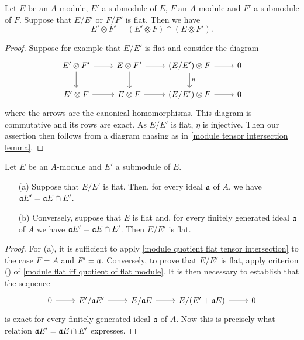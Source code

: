 \begin{proposition}\label{module quotient flat tensor intersection}
Let $E$ be an $A$-module, $E'$ a submodule of $E$, $F$ an $A$-module and $F'$ a submodule of $F$. Suppose that $E/E'$ or $F/F'$ is flat. Then we have
\[E'\otimes F'=(E'\otimes F)\cap(E\otimes F').\]
\end{proposition}
\begin{proof}
Suppose for example that $E/E'$ is flat and consider the diagram
\[\begin{tikzcd}
E'\otimes F'\ar[r]\ar[d]&E\otimes F'\ar[r]\ar[d]&(E/E')\otimes F\ar[r]\ar[d,"\eta"]&0\\
E'\otimes F\ar[r]&E\otimes F\ar[r]&(E/E')\otimes F\ar[r]&0
\end{tikzcd}\]
where the arrows are the canonical homomorphisms. This diagram is commutative and its rows are exact. As $E/E'$ is flat, $\eta$ is injective. Then our assertion then follows from a diagram chasing as in \cref{module tensor intersection lemma}.
\end{proof}
\begin{corollary}\label{module quotient flat iff product with submodule}
Let $E$ be an $A$-module and $E'$ a submodule of $E$.
\begin{itemize}
\item[(a)] Suppose that $E/E'$ is flat. Then, for every ideal $\mathfrak{a}$ of $A$, we have $\mathfrak{a} E'=\mathfrak{a} E\cap E'$.
\item[(b)] Conversely, suppose that $E$ is flat and, for every finitely generated ideal $\mathfrak{a}$ of $A$ we have $\mathfrak{a} E'=\mathfrak{a} E\cap E'$. Then $E/E'$ is flat.
\end{itemize}
\end{corollary}
\begin{proof}
For (a), it is sufficient to apply \cref{module quotient flat tensor intersection} to the case $F=A$ and $F'=\mathfrak{a}$. Conversely, to prove that $E/E'$ is flat, apply criterion () of \cref{module flat iff quotient of flat module}. It is then necessary to establish that the sequence
\[\begin{tikzcd}
0\ar[r]&E'/\a E'\ar[r]&E/\a E\ar[r]&E/(E'+\a E)\ar[r]&0
\end{tikzcd}\]
is exact for every finitely generated ideal $\mathfrak{a}$ of $A$. Now this is precisely what relation $\mathfrak{a} E'=\mathfrak{a} E\cap E'$ expresses.
\end{proof}
